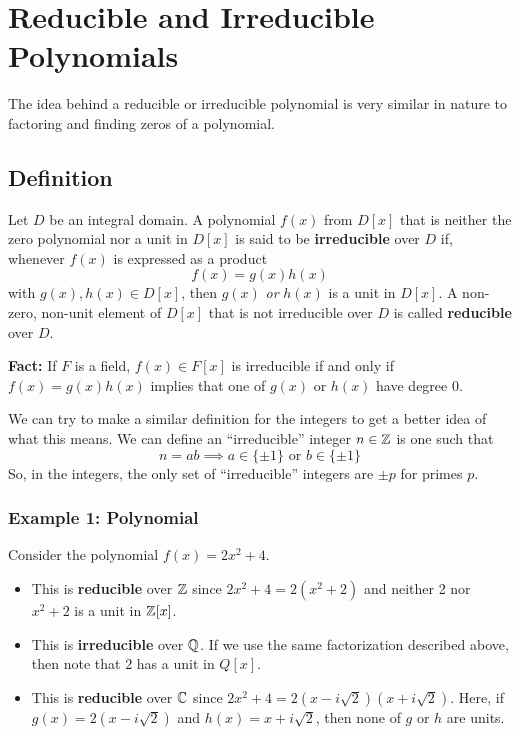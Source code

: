 \documentclass[letterpaper]{article}
\begin{document}
\section{Reducible and Irreducible Polynomials}
The idea behind a reducible or irreducible polynomial is very similar in nature to factoring and finding zeros of a polynomial. 

\subsection{Definition}
\begin{definition}{}{}
    Let $D$ be an integral domain. A polynomial $f(x)$ from $D[x]$ that is neither the zero polynomial nor a unit in $D[x]$ is said to be \textbf{irreducible} over $D$ if, whenever $f(x)$ is expressed as a product 
    \[f(x) = g(x)h(x)\]
    with $g(x), h(x) \in D[x]$, then $g(x)$ \emph{or} $h(x)$ is a unit in $D[x]$. A non-zero, non-unit element of $D[x]$ that is not irreducible over $D$ is called \textbf{reducible} over $D$.  
\end{definition}
\textbf{Fact:} If $F$ is a field, $f(x) \in F[x]$ is irreducible if and only if $f(x) = g(x) h(x)$ implies that one of $g(x)$ or $h(x)$ have degree 0. 

\bigskip 

We can try to make a similar definition for the integers to get a better idea of what this means. We can define an ``irreducible'' integer $n \in \mathbb{Z}$ is one such that 
\[n = ab \implies a \in \{\pm 1\} \text{ or } b \in \{\pm 1\}\]
So, in the integers, the only set of ``irreducible'' integers are $\pm p$ for primes $p$. 

\subsubsection{Example 1: Polynomial}
Consider the polynomial $f(x) = 2x^2 + 4$. 
\begin{itemize}
    \item This is \textbf{reducible} over $\mathbb{Z}$ since $2x^2 + 4 = 2(x^2 + 2)$ and neither 2 nor $x^2 + 2$ is a unit in $\mathbb{Z}[x]$. 
    \item This is \textbf{irreducible} over $\mathbb{Q}$. If we use the same factorization described above, then note that $2$ has a unit in $Q[x]$. 
    \item This is \textbf{reducible} over $\mathbb{C}$ since $2x^2 + 4 = 2(x - i\sqrt{2})(x + i\sqrt{2})$. Here, if $g(x) = 2(x - i\sqrt{2})$ and $h(x) = x + i\sqrt{2}$, then none of $g$ or $h$ are units. 
\end{itemize}
\end{document}
